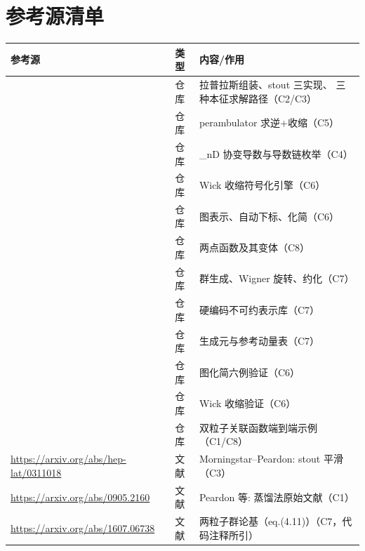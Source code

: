 \documentclass[UTF8]{ctexart}
\begin{document}
\section{参考源清单}

\begin{xltabular}{\textwidth}{llX}
\toprule
\textcolor{evidence}{参考源} & 类型 & 内容/作用 \\
\midrule
\endhead
\texttt{} & 仓库 & 拉普拉斯组装、stout 三实现、
  三种本征求解路径（C2/C3） \\
\texttt{} & 仓库 & perambulator 求逆+收缩（C5） \\
\texttt{} & 仓库 & \_nD 协变导数与导数链枚举（C4） \\
\texttt{} & 仓库 & Wick 收缩符号化引擎（C6） \\
\texttt{} & 仓库 & 图表示、自动下标、化简（C6） \\
\texttt{} & 仓库 & 两点函数及其变体（C8） \\
\texttt{} & 仓库 & 群生成、Wigner 旋转、约化（C7） \\
\texttt{} & 仓库 & 硬编码不可约表示库（C7） \\
\texttt{} & 仓库 & 生成元与参考动量表（C7） \\
\texttt{} & 仓库 & 图化简六例验证（C6） \\
\texttt{} & 仓库 & Wick 收缩验证（C6） \\
\texttt{} & 仓库 & 双粒子关联函数端到端示例（C1/C8） \\
\url{https://arxiv.org/abs/hep-lat/0311018} & 文献 & Morningstar--Peardon: stout 平滑（C3） \\
\url{https://arxiv.org/abs/0905.2160} & 文献 & Peardon 等: 蒸馏法原始文献（C1） \\
\url{https://arxiv.org/abs/1607.06738} & 文献 & 两粒子群论基（eq.(4.11)）（C7，代码注释所引） \\
\bottomrule
\end{xltabular}
\end{document}
